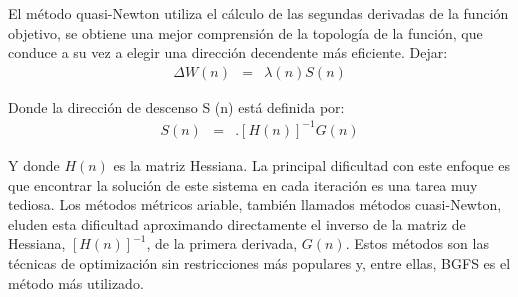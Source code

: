 

El método quasi-Newton utiliza el cálculo de las segundas derivadas de la función objetivo, se obtiene una mejor comprensión de la topología de la función, que conduce a su vez a elegir una dirección decendente más eficiente. Dejar:
\begin{eqnarray}
	\Delta W(n) &=& \lambda(n)S(n)
\end{eqnarray}

Donde la dirección de descenso S (n) está definida por:
\begin{eqnarray}
	S(n) &=& .[H(n)]^{-1}G(n)
\end{eqnarray}

Y donde $H(n)$ es la matriz Hessiana. La principal dificultad con este enfoque es que encontrar la solución de este sistema en cada iteración es una tarea muy tediosa. Los métodos métricos ariable, también llamados métodos cuasi-Newton, eluden esta dificultad aproximando directamente el inverso de la matriz de Hessiana, $[H(n)]^{-1}$, de la primera derivada, $G(n)$. Estos métodos son las técnicas de optimización sin restricciones más populares y, entre ellas, BGFS es el método más utilizado.%




